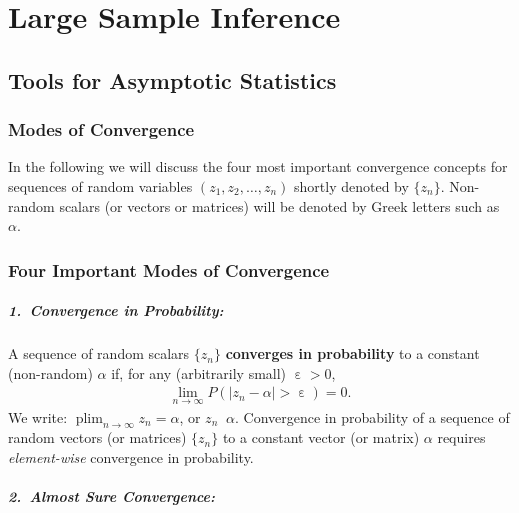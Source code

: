 \documentclass[
  14pt,
]{memoir}
\DeclareMathOperator{\eps}{\varepsilon}
\DeclareMathOperator{\plim}{plim}
\DeclareMathOperator{\toprob}{\overset{p}{\longrightarrow}}
\begin{document}
\hypertarget{ch:LSINF}{%
\chapter{Large Sample Inference}\label{ch:LSINF}}

\hypertarget{tools-for-asymptotic-statistics}{%
\section{Tools for Asymptotic Statistics}\label{tools-for-asymptotic-statistics}}

\hypertarget{modes-of-convergence}{%
\subsection{Modes of Convergence}\label{modes-of-convergence}}

In the following we will discuss the four most important convergence concepts for sequences of random variables \((z_1,z_2,\dots,z_n)\) shortly denoted by \(\{z_n\}\). Non-random scalars (or vectors or matrices) will be denoted by Greek letters such as \(\alpha\).

\hypertarget{four-important-modes-of-convergence}{%
\subsection*{Four Important Modes of Convergence}\label{four-important-modes-of-convergence}}

\paragraph*{1.~Convergence in Probability:}

A sequence of random scalars \(\{z_n\}\) \textbf{converges in probability} to a constant (non-random) \(\alpha\) if, for any (arbitrarily small) \(\eps>0\),
\begin{eqnarray*}
  \lim_{n\to\infty} P\left(|z_n-\alpha|>\eps\right)=0.
\end{eqnarray*}
We write: \(\plim_{n\to\infty}z_n=\alpha\), or \(z_n\toprob\alpha\). Convergence in probability of a sequence of random vectors (or matrices) \(\{z_n\}\) to a constant vector (or matrix) \(\alpha\) requires \emph{element-wise} convergence in probability.

\paragraph*{2.~Almost Sure Convergence:}
\end{document}
